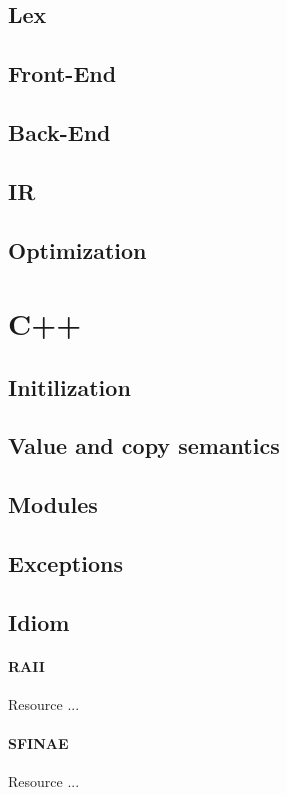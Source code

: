 \documentclass{article}
\begin{document}
\subsection{Lex}
\subsection{Front-End}
\subsection{Back-End}
\subsection{IR}
\subsection{Optimization}
\section{C++}
\subsection{Initilization}
\subsection{Value and copy semantics}
\subsection{Modules}
\subsection{Exceptions}
\subsection{Idiom}
\paragraph{RAII} Resource ...
\paragraph{SFINAE} Resource ...
\end{document}
